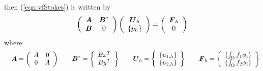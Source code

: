 \documentclass[a4paper,twoside,12pt]{book}
\def\vec#1{\mbox{\boldmath $#1$}}
\begin{document}
then (\ref{eqn:vfStokes}) is written by
\begin{eqnarray}
\left(
\begin{array}{cc}
\vec{A}&\vec{\vec{B}}^*\\
\vec{B}&0
\end{array}
\right)
\left(
\begin{array}{cc}
\vec{U}_h\\
\{p_h\}
\end{array}
\right)
=
\left(
\begin{array}{cc}
\vec{F}_h\\
0
\end{array}
\right)
\end{eqnarray}
where
\begin{eqnarray*}
&&\vec{A}=\left(
\begin{array}{cc}
A&0\\
0&A
\end{array}
\right)
\qquad
\vec{B}^*=\left\{
\begin{array}{c}
Bx^T\\
By^T
\end{array}
\right\}
\qquad
\vec{U}_h=\left\{
\begin{array}{c}
\{u_{1,h}\}\\
\{u_{2,h}\}
\end{array}
\right\}
\qquad
\vec{F}_h=\left\{
\begin{array}{c}
\{\textstyle{\int_{\Omega}f_1\phi_i}\}\\
\{\textstyle{\int_{\Omega}f_2\phi_i}\}
\end{array}
\right\}
\end{eqnarray*}
\end{document}
